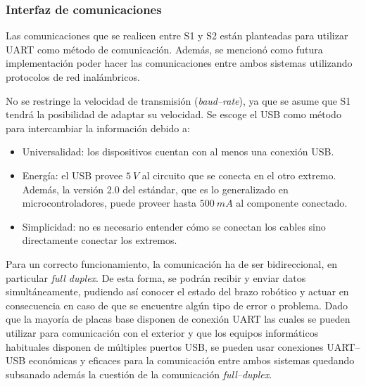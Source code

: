 \subsubsection{Interfaz de comunicaciones}
Las comunicaciones que se realicen entre \ac{S1} y \ac{S2} están planteadas para utilizar \ac{UART} como método de comunicación. Además, se mencionó como futura implementación poder hacer las comunicaciones entre ambos sistemas utilizando protocolos de red inalámbricos.

No se restringe la velocidad de transmisión (\textit{baud--rate}), ya que se asume que \ac{S1} tendrá la posibilidad de adaptar su velocidad. Se escoge el \ac{USB} como método para intercambiar la información debido a:

\begin{itemize}
    \item Universalidad: los dispositivos cuentan con al menos una conexión \ac{USB}.
    \item Energía: el \ac{USB} provee $5~V$ al circuito que se conecta en el otro extremo. Además, la versión 2.0 del estándar, que es lo generalizado en microcontroladores, puede proveer hasta $500~mA$ al componente conectado.
    \item Simplicidad: no es necesario entender cómo se conectan los cables sino directamente conectar los extremos.
\end{itemize}

Para un correcto funcionamiento, la comunicación ha de ser bidireccional, en particular \textit{full duplex}. 
De esta forma, se podrán recibir y enviar datos simultáneamente, pudiendo así conocer el estado del brazo robótico 
y actuar en consecuencia en caso de que se encuentre algún tipo de error o problema. 
Dado que la mayoría de placas base disponen de conexión \ac{UART} las cuales se pueden
utilizar para comunicación con el exterior y que los equipos informáticos habituales
disponen de múltiples puertos \ac{USB}, se pueden usar conexiones \ac{UART}--\ac{USB}
económicas y eficaces para la comunicación entre ambos sistemas quedando subsanado además
la cuestión de la comunicación \textit{full--duplex}.